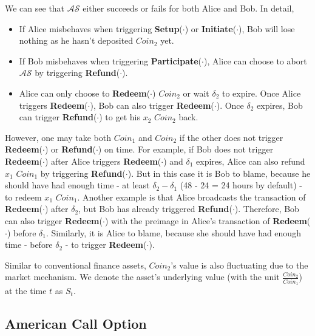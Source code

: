 We can see that $\mathcal{AS}$ either succeeds or fails for both Alice and Bob.
In detail,

\begin{itemize}
    \item If Alice misbehaves when triggering \textbf{Setup}($\cdot$) or \textbf{Initiate}($\cdot$), Bob will lose nothing as he hasn't deposited $Coin_2$ yet.
    \item If Bob misbehaves when triggering \textbf{Participate}($\cdot$), Alice can choose to abort $\mathcal{AS}$ by triggering \textbf{Refund}($\cdot$).
    \item Alice can only choose to \textbf{Redeem}($\cdot$) $Coin_2$ or wait $\delta_2$ to expire.
    Once Alice triggers \textbf{Redeem}($\cdot$), Bob can also trigger \textbf{Redeem}($\cdot$).
    Once $\delta_2$ expires, Bob can trigger \textbf{Refund}($\cdot$) to get his $x_2$ $Coin_2$ back.
\end{itemize}

However, one may take both $Coin_1$ and $Coin_2$ if the other does not trigger \textbf{Redeem}($\cdot$) or \textbf{Refund}($\cdot$) on time.
For example, if Bob does not trigger \textbf{Redeem}($\cdot$) after Alice triggers \textbf{Redeem}($\cdot$) and $\delta_1$ expires, Alice can also refund $x_1$ $Coin_1$ by triggering \textbf{Refund}($\cdot$).
But in this case it is Bob to blame, because he should have had enough time - at least $\delta_2 - \delta_1$ (48 - 24 = 24 hours by default) - to redeem $x_1$ $Coin_1$.
Another example is that Alice broadcasts the transaction of \textbf{Redeem}($\cdot$) after $\delta_2$, but Bob has already triggered \textbf{Refund}($\cdot$).
Therefore, Bob can also trigger \textbf{Redeem}($\cdot$) with the preimage in Alice's transaction of \textbf{Redeem}($\cdot$) before $\delta_1$.
Similarly, it is Alice to blame, because she should have had enough time - before $\delta_2$ - to trigger \textbf{Redeem}($\cdot$).

Similar to conventional finance assets, $Coin_2$'s value is also fluctuating due to the market mechanism.
We denote the asset's underlying value (with the unit $\frac{Coin_2}{Coin_1}$) at the time $t$ as $S_t$.















\subsection{American Call Option}


